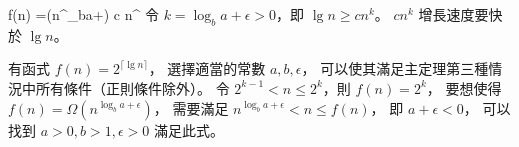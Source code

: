 \startsplitformula\startmathalignment
\NC f(n) \NC =\Omega(n^{\log_b{a+\epsilon}}) \NR
\NC \NC \ge c n^{\lg\epsilon} \NR
\stopmathalignment\stopsplitformula
令 $k=\log_b{a+\epsilon}>0$，即 $\lg n \ge c n^k$。
 $cn^k$ 增長速度要快於 $\lg n$。
\stopANSWER

\startEXERCISE
有函式 $f(n)=2^{\lceil \lg n\rceil}$，
選擇適當的常數 $a,b,\epsilon$，
可以使其滿足主定理第三種情況中所有條件（正則條件除外）。
\stopEXERCISE
\startANSWER
令 $2^{k-1}< n\le 2^{k}$，則 $f(n)=2^k$，
要想使得 $f(n)=\Omega(n^{\log_b{a+\epsilon}})$，
需要滿足 $n^{\log_b{a+\epsilon}} < n\le f(n)$，
即 $a+\epsilon < 0$，
可以找到 $a>0,b>1,\epsilon>0$ 滿足此式。
\stopANSWER

\stopsection
